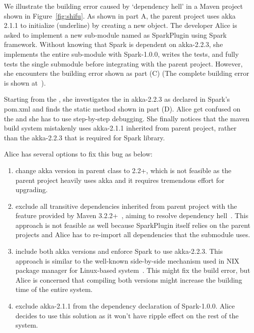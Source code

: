 We illustrate the building error caused by `dependency hell' in a Maven project shown in Figure~\ref{fig:shifu}. As shown in part A, the parent project uses akka 2.1.1 to initialize  (underline) by creating a new  object. The developer Alice is asked to implement a new sub-module named as SparkPlugin using Spark framework. Without knowing that Spark is dependent on akka-2.2.3, she implements the entire sub-module with Spark-1.0.0, writes the tests, and fully tests the single submodule before integrating with the parent project. However, she encounters the building error shown as part (C) (The complete building error is shown at~\cite{shifu}). 


Starting from the , she investigates the   in akka-2.2.3 as declared in Spark's pom.xml and finds the static  method shown in part (D). Alice get confused on the  and she has to use step-by-step debugging. She finally notices that the maven build system mistakenly uses akka-2.1.1 inherited from parent project, rather than the akka-2.2.3 that is required for Spark library. 


  Alice has several options to fix this bug as below:
\begin{enumerate}
\item change akka version in parent class to 2.2+, which is not feasible as the parent project heavily uses akka and it requires tremendous effort for upgrading.
\item  exclude all transitive dependencies inherited from parent project with the feature provided by Maven 3.2.2+~\cite{maven:note}, aiming to resolve dependency hell~\cite{maven:hell}. This approach is not feasible as well because SparkPlugin itself relies on the parent projects and Alice has to re-import all dependencies that the submodule uses.
\item include both akka versions and enforce Spark to use akka-2.2.3. This approach is similar to the well-known side-by-side  mechanism used in NIX package manager for Linux-based system~\cite{nix}. This might fix the build error, but Alice is concerned that compiling both versions might increase the building time of the entire system. 
\item exclude akka-2.1.1 from the dependency declaration of Spark-1.0.0. Alice decides to use this solution as it won't have ripple effect on the rest of the system.
\end{enumerate}


